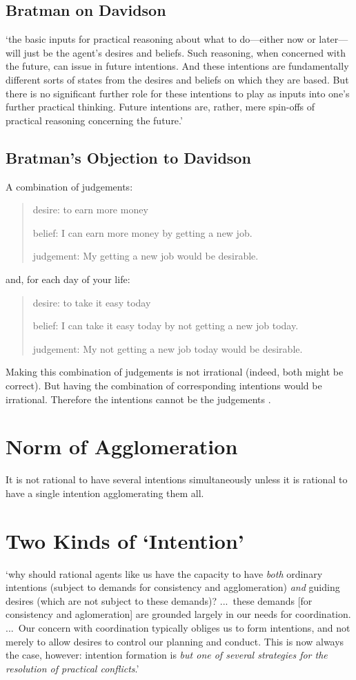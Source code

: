 \documentclass[11pt]{extarticle}
\begin{document}
\begin{multicols}{3}
\subsection{Bratman on Davidson}
`the basic inputs for practical reasoning about what to do---either now or later---will just be the agent's desires and beliefs. 
Such reasoning, when concerned with the future, can issue in future intentions. 
And these intentions are fundamentally different sorts of states from the desires and beliefs on which they are based. 
But there is no significant further role for these intentions to play as inputs into one's further practical thinking. 
Future intentions are, rather, mere spin-offs of practical reasoning concerning the future.' \citep[p.\ 222]{Bratman:1985fk} %

\subsection{Bratman's Objection to Davidson}
A combination of judgements:
%
\begin{quote}
desire: to earn more money

belief: I can earn more money by getting a new job.

judgement: My getting a new job would be desirable.
\end{quote}
and, for each day of your life:
\begin{quote}
desire: to take it easy today

belief: I can take it easy today by not getting a new job today.

judgement: My not getting a new job today would be desirable.
\end{quote}
Making this combination of judgements is not irrational (indeed, both might be correct).
But having the combination of corresponding intentions would be irrational.
Therefore the intentions cannot be the judgements \citep[cf][]{bratman:2000_valuing}.

\section{Norm of Agglomeration}
It is not rational to have several intentions simultaneously unless it is rational to have a single intention agglomerating them all.  


\section{Two Kinds of `Intention'}
`why should rational agents like us have the capacity to have \emph{both} ordinary intentions (subject to demands for consistency and agglomeration) \emph{and} guiding desires (which are not subject to these demands)?
...\ these demands [for consistency and aglomeration] are grounded largely in our needs for coordination.
...\
Our concern with coordination typically obliges us to form intentions, and not merely to allow desires to control our planning and conduct.
This is now always the case, however: intention formation is \emph{but one of several strategies for the resolution of practical conflicts}.'
\citep[][pp.\ 137--8, my italics]{Bratman:1987xw}



\end{multicols}
\end{document}
